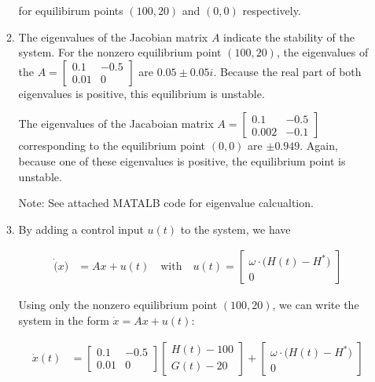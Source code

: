 \documentclass[11pt]{article}
\theoremstyle{definition}
\begin{document}
\begin{enumerate}
\begin{enumerate}
        for equilibirum points $(100, 20)$ and $(0, 0)$ respectively.
        \item %
        The eigenvalues of the Jacobian matrix $A$ indicate the stability of the system.  For the nonzero equilibrium point $(100, 20)$, the eigenvalues of the $A = \begin{bmatrix} 0.1 & -0.5 \\ 0.01 & 0 \end{bmatrix}$ are $0.05 \pm 0.05 i$.  Because the real part of both eigenvalues is positive, this equilibrium is unstable.

        The eigenvalues of the Jacaboian matrix $A = \begin{bmatrix} 0.1 & -0.5 \\ 0.002 & -0.1 \end{bmatrix}$ corresponding to the equilibrium point $(0, 0)$ are $\pm 0.949$.  Again, because one of these eigenvalues is positive, the equilibrium point is unstable.

        Note: See attached MATALB code for eigenvalue calcualtion.

        \item %
        By adding a control input $u(t)$ to the system, we have

        \begin{align}
            \dot(x) &= Ax + u(t) \quad \text{with} \quad u(t) = \begin{bmatrix} \omega \cdot \big( H(t) - H^* \big) \\ 0 \end{bmatrix}
        \end{align}

        Using only the nonzero equilibrium point $(100, 20)$, we can write the system in the form $\dot{x} = Ax + u(t)$:

        \begin{align}
            \dot{x}(t) &= \begin{bmatrix} 0.1 & -0.5 \\ 0.01 & 0 \end{bmatrix} \begin{bmatrix} H(t) - 100 \\ G(t) - 20 \end{bmatrix} + \begin{bmatrix} \omega \cdot \big( H(t) - H^* \big) \\ 0 \end{bmatrix}
        \end{align}


\end{enumerate}
\end{enumerate}
\end{document}
